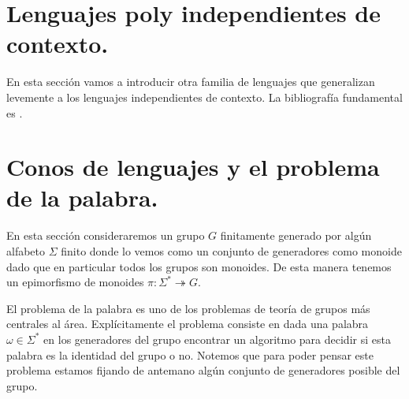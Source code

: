 \documentclass[tesis.tex]{subfiles}
\newcommand{\APD}{automáta de pila determinístico }
\begin{document}
\begin{ej}
	\begin{comment}[Esto es con la otra definición de automáta de pila.]
			Por el principio del palomar podemos ver que este lenguaje no es aceptado por \APD por pila vacía y estado final a la vez. Si así lo fuera supongamos que existe un automáta que lo acepta $M = (Q, \Sigma, Z, Z_0, \delta, q_0 , F)$. Debido a que tiene finitos estados podemos elegirnos $m$ suficientemente grande tal que existan palabras $a^mb^j, a^mb^i$ con $1 \le i < j < m$ y elegidas de manera que terminen en el mismo estado final $p$. Notemos que $(q_0,a^mb^ib^{m-j+1},Z_0) \vdash^* (q,\lambda, Z)$ donde $q$ es un estado final dado que $m-j+1+i \le m$. Por otro lado debe ser que $(q_0, a^mb^jb^{m-j+1}) \vdash^* (q,\lambda, Z) $ pero notemos que $a^mb^{m-1} \notin L$. Por lo tanto llegamos a una contradicción y de esta manera vemos que $L$ no es aceptado por un \APD especial tal como queríamos ver.
	\end{comment}

	
\end{ej}





\section{Lenguajes poly independientes de contexto.}

En esta sección vamos a introducir otra familia de lenguajes que generalizan levemente a los lenguajes independientes de contexto. 
La bibliografía fundamental es \cite{brough2014groups}.


\section{Conos de lenguajes y el problema de la palabra.}

En esta sección consideraremos un grupo $G$ finitamente generado por algún alfabeto $\Sigma$ finito donde lo vemos como un conjunto de generadores como monoide dado que en particular todos los grupos son monoides. 
De esta manera tenemos un epimorfismo de monoides $\pi: \Sigma^* \twoheadrightarrow  G$. 

El problema de la palabra es uno de los problemas de teoría de grupos más centrales al área. Explícitamente el problema consiste en dada una palabra $\omega \in \Sigma^*$ en los generadores del grupo encontrar un algoritmo para decidir si esta palabra es la identidad del grupo o no. Notemos que para poder pensar este problema estamos fijando de antemano algún conjunto de generadores posible del grupo.
\end{document}
